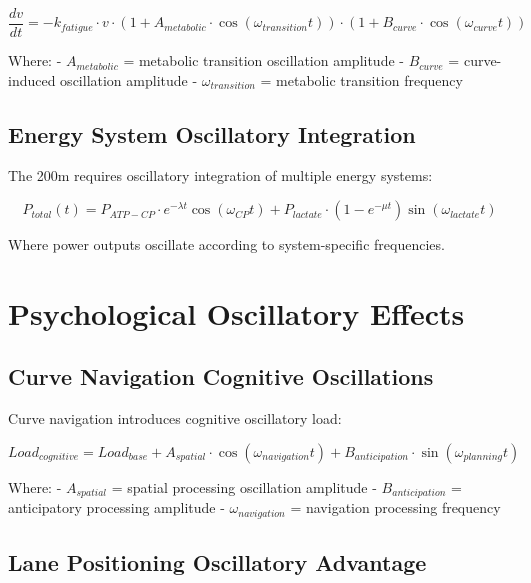 \documentclass[12pt]{article}
\begin{document}
\begin{equation}
\frac{dv}{dt} = -k_{fatigue} \cdot v \cdot \left(1 + A_{metabolic} \cdot \cos(\omega_{transition}t)\right) \cdot \left(1 + B_{curve} \cdot \cos(\omega_{curve}t)\right)
\end{equation}

Where:
- $A_{metabolic}$ = metabolic transition oscillation amplitude
- $B_{curve}$ = curve-induced oscillation amplitude
- $\omega_{transition}$ = metabolic transition frequency

\subsection{Energy System Oscillatory Integration}

The 200m requires oscillatory integration of multiple energy systems:

\begin{equation}
P_{total}(t) = P_{ATP-CP} \cdot e^{-\lambda t} \cos(\omega_{CP}t) + P_{lactate} \cdot (1-e^{-\mu t}) \sin(\omega_{lactate}t)
\end{equation}

Where power outputs oscillate according to system-specific frequencies.

\section{Psychological Oscillatory Effects}

\subsection{Curve Navigation Cognitive Oscillations}

Curve navigation introduces cognitive oscillatory load:

\begin{equation}
Load_{cognitive} = Load_{base} + A_{spatial} \cdot \cos(\omega_{navigation}t) + B_{anticipation} \cdot \sin(\omega_{planning}t)
\end{equation}

Where:
- $A_{spatial}$ = spatial processing oscillation amplitude
- $B_{anticipation}$ = anticipatory processing amplitude
- $\omega_{navigation}$ = navigation processing frequency

\subsection{Lane Positioning Oscillatory Advantage}
\end{document}
